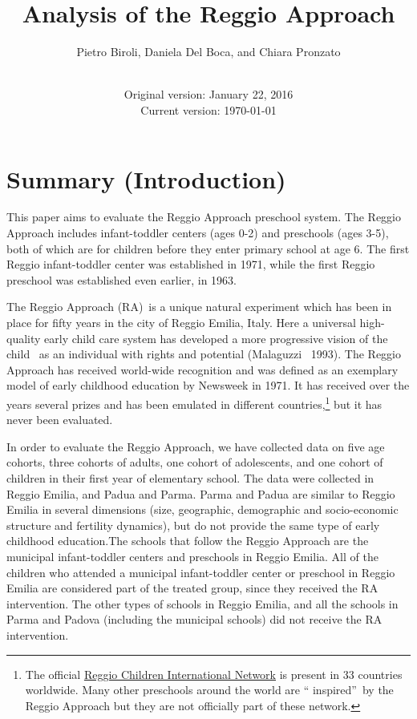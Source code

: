 \documentclass[12pt]{article}
\begin{document}
\title{Analysis of the Reggio Approach}
\author{Pietro Biroli, Daniela Del Boca, and Chiara Pronzato }
\date[VERY PRELIMINARY DRAFT]{ \\
Original version: January 22, 2016 \\
Current version: \today }
\maketitle

\bigskip

\doublespacing

%

\section{Summary (Introduction)}

This paper aims to evaluate the Reggio Approach preschool system. The Reggio
Approach includes infant-toddler centers (ages 0-2) and preschools (ages
3-5), both of which are for children before they enter primary school at age
6. The first Reggio infant-toddler center was established in 1971, while the
first Reggio preschool was established even earlier, in 1963.

The Reggio Approach (RA)\ is a unique natural experiment which has been in
place for fifty years in the city of Reggio Emilia, Italy. Here a universal
high-quality early child care system has developed a more progressive vision
of the child \ as an individual with rights and potential (Malaguzzi \
1993). The Reggio Approach has received world-wide recognition and was
defined as an exemplary model of early childhood education by Newsweek in
1971. It has received over the years several prizes and has been emulated in
different countries,\footnote{%
The official \href{http://www.reggiochildren.it/network/?lang=en}{Reggio
Children International Network} is present in 33 countries worldwide. Many
other preschools around the world are \textquotedblleft
inspired\textquotedblright\ by the Reggio Approach but they are not
officially part of these network.} but it has never been evaluated.

In order to evaluate the Reggio Approach, we have collected data on five age
cohorts, three cohorts of adults, one cohort of adolescents, and one cohort
of children in their first year of elementary school. The data were
collected in Reggio Emilia, and Padua and Parma. Parma and Padua are similar
to Reggio Emilia in several dimensions (size, geographic, demographic and
socio-economic structure and fertility dynamics), but do not provide the
same type of early childhood education.The schools that follow the Reggio
Approach are the municipal infant-toddler centers and preschools in Reggio
Emilia. All of the children who attended a municipal infant-toddler center
or preschool in Reggio Emilia are considered part of the treated group,
since they received the RA intervention. The other types of schools in
Reggio Emilia, and all the schools in Parma and Padova (including the
municipal schools) did not receive the RA intervention.
\end{document}
